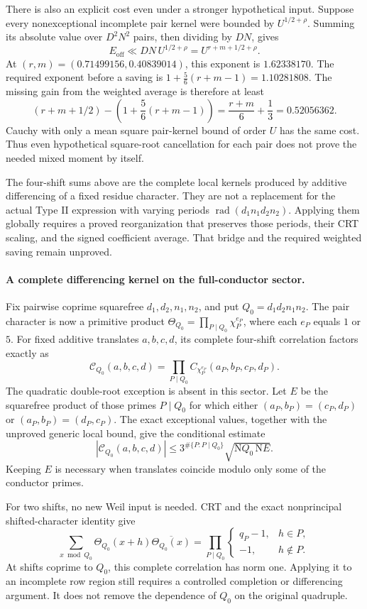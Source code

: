 \documentclass[11pt]{article}
\newcommand{\Nm}{\mathrm N}
\newcommand{\rad}{\operatorname{rad}}
\begin{document}
There is also an explicit cost even under a stronger hypothetical
input. Suppose every nonexceptional incomplete pair kernel were
bounded by \(U^{1/2+\rho}\). Summing its absolute value over
\(D^2N^2\) pairs, then dividing by \(DN\), gives
\[
 E_{\mathrm{off}}\ll DN\,U^{1/2+\rho}
       =U^{r+m+1/2+\rho}.
\]
At \((r,m)=(0.71499156,0.40839014)\), this exponent is
\(1.62338170\). The required exponent before a saving is
\(1+\frac56(r+m-1)=1.10281808\).
The missing gain from the weighted average is therefore at least
\[
 (r+m+1/2)-\left(1+\frac56(r+m-1)\right)
       =\frac{r+m}{6}+\frac13=0.52056362.
\]
Cauchy with only a mean square pair-kernel bound of order \(U\)
has the same cost. Thus even hypothetical square-root cancellation
for each pair does not prove the needed mixed moment by itself.

The four-shift sums above are the complete local kernels produced by
additive differencing of a fixed residue character. They are not a
replacement for the actual Type II expression with varying periods
\(\rad(d_1n_1d_2n_2)\).
Applying them globally requires a proved reorganization that preserves
those periods, their CRT scaling, and the signed coefficient average.
That bridge and the required weighted saving remain unproved.

\paragraph{A complete differencing kernel on the full-conductor sector.}
Fix pairwise coprime squarefree \(d_1,d_2,n_1,n_2\), and put
\(Q_0=d_1d_2n_1n_2\). The pair character is now a primitive product
\(\Theta_{Q_0}=\prod_{P\mid Q_0}\chi_P^{e_P}\), where each
\(e_P\) equals \(1\) or \(5\).
For fixed additive translates \(a,b,c,d\), its complete four-shift
correlation factors exactly as
\[
 \mathcal C_{Q_0}(a,b,c,d)=
  \prod_{P\mid Q_0}C_{\chi_P^{e_P}}(a_P,b_P,c_P,d_P).
\]
The quadratic double-root exception is absent in this sector.
Let \(E\) be the squarefree product of those primes \(P\mid Q_0\)
for which either
\((a_P,b_P)=(c_P,d_P)\) or
\((a_P,b_P)=(d_P,c_P)\).
The exact exceptional values, together with the unproved generic
local bound, give the conditional estimate
\[
 |\mathcal C_{Q_0}(a,b,c,d)|
    \le3^{\#\{P:P\mid Q_0\}}
           \sqrt{\Nm Q_0\,\Nm E}.
\]
Keeping \(E\) is necessary when translates coincide modulo only
some of the conductor primes.

For two shifts, no new Weil input is needed. CRT and the exact
nonprincipal shifted-character identity give
\[
 \sum_{x\bmod Q_0}\Theta_{Q_0}(x+h)
                       \overline{\Theta_{Q_0}(x)}=
 \prod_{P\mid Q_0}
 \begin{cases}q_P-1,&h\in P,\\-1,&h\notin P.\end{cases}
\]
At shifts coprime to \(Q_0\), this complete correlation has norm
one. Applying it to an incomplete row region still requires a
controlled completion or differencing argument. It does not remove
the dependence of \(Q_0\) on the original quadruple.
\end{document}
